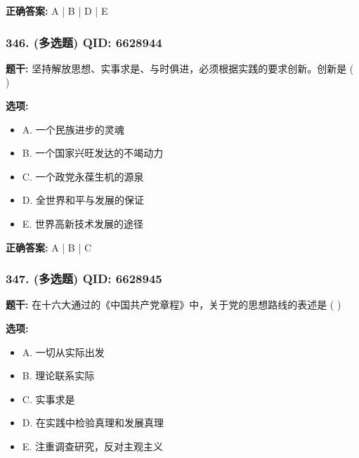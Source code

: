\documentclass[12pt,UTF8]{ctexart}
\begin{document}
\textbf{正确答案:}
A | B | D | E

\vspace{0.3em}\hrulefill\vspace{0.7em}

\subsubsection*{346. (多选题) \small QID: 6628944}

\textbf{题干:}
坚持解放思想、实事求是、与时俱进，必须根据实践的要求创新。创新是  ( )

\textbf{选项:}
\begin{itemize}[leftmargin=*]

  \item A. 一个民族进步的灵魂

  \item B. 一个国家兴旺发达的不竭动力

  \item C. 一个政党永葆生机的源泉

  \item D. 全世界和平与发展的保证

  \item E. 世界高新技术发展的途径

\end{itemize}

\textbf{正确答案:}
A | B | C

\vspace{0.3em}\hrulefill\vspace{0.7em}

\subsubsection*{347. (多选题) \small QID: 6628945}

\textbf{题干:}
在十六大通过的《中国共产党章程》中，关于党的思想路线的表述是  ( )

\textbf{选项:}
\begin{itemize}[leftmargin=*]

  \item A. 一切从实际出发

  \item B. 理论联系实际

  \item C. 实事求是

  \item D. 在实践中检验真理和发展真理

  \item E. 注重调查研究，反对主观主义

\end{itemize}
\end{document}
